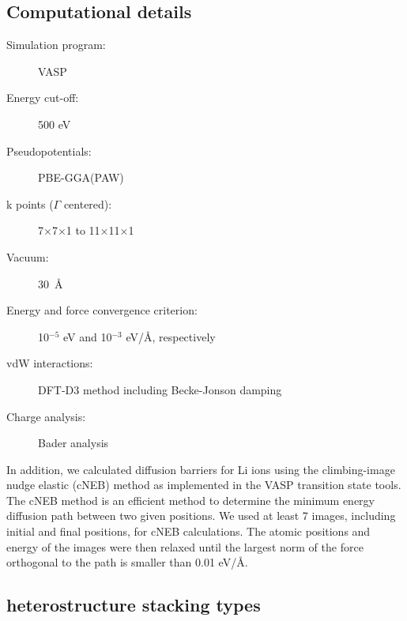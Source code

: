 \subsection{Computational details}
\begin{footnotesize}
\begin{description}
\item[Simulation program:] VASP
\item[Energy cut-off:] 500 eV
\item[Pseudopotentials:] PBE-GGA(PAW)
\item[k points ($\Gamma$ centered):] 7$\times$7$\times$1 to 11$\times$11$\times$1
\item[Vacuum:] 30~\AA
\item[Energy and force convergence criterion:] 10$^{-5}$ eV and 10$^{-3}$ eV/\AA, respectively
\item[vdW interactions:] DFT-D3 method \citet{Grimme2011} including Becke-Jonson damping
\item[Charge analysis:] Bader analysis \cite{Bader1,Bader2,Bader3,Bader4}
\end{description}
\end{footnotesize}
\vspace{0.5cm}

In addition, we calculated diffusion barriers for Li ions using the climbing-image nudge elastic (cNEB) method as implemented in the VASP transition state tools\cite{c-neb1,c-neb2}. The cNEB method is an efficient method to determine the minimum energy diffusion path between two given positions. We used at least 7 images, including initial and final positions, for cNEB calculations. The atomic positions and energy of the images were then relaxed until the largest norm of the force orthogonal to the path is smaller than 0.01 eV/{\AA}. 

\subsection{heterostructure stacking types}

